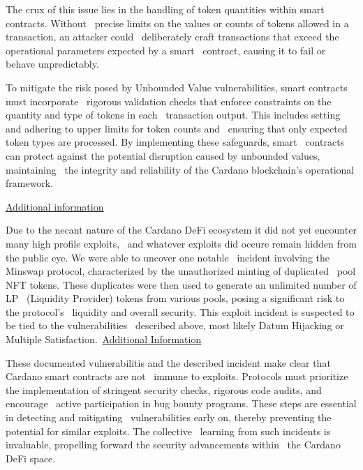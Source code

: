 \documentclass{scrreport}
\begin{document}
\begin{enumerate}
    The crux of this issue lies in the handling of token quantities within smart contracts. Without \
    precise limits on the values or counts of tokens allowed in a transaction, an attacker could \
    deliberately craft transactions that exceed the operational parameters expected by a smart \
    contract, causing it to fail or behave unpredictably.\
    
    To mitigate the risk posed by Unbounded Value vulnerabilities, smart contracts must incorporate \
    rigorous validation checks that enforce constraints on the quantity and type of tokens in each \
    transaction output. This includes setting and adhering to upper limits for token counts and \
    ensuring that only expected token types are processed. By implementing these safeguards, smart \
    contracts can protect against the potential disruption caused by unbounded values, maintaining \
    the integrity and reliability of the Cardano blockchain's operational framework.\
    
    \href{https://github.com/input-output-hk/Certification-working-group/blob/borja/unbounded-value/Vulnerabilities/Vulnerabilities/CTI-2023-ADA-1104.md}{Additional information}

\end{enumerate}

Due to the necant nature of the Cardano DeFi ecosystem it did not yet encounter many high profile exploits, \ 
and whatever exploits did occure remain hidden from the public eye. We were able to uncover one notable \
incident involving the Minswap protocol, characterized by the unauthorized minting of duplicated \
pool NFT tokens. These duplicates were then used to generate an unlimited number of LP \
(Liquidity Provider) tokens from various pools, posing a significant risk to the protocol's \
liquidity and overall security. This exploit incident is suspected to be tied to the vulnerabilities \
described above, most likely Datum Hijacking or Multiple Satisfaction.\ \href{https://minswap-labs.medium.com/vulnerability-patch-technical-details-and-steps-forward-97f6ee35aa91}{Additional Information}
\newline

These documented vulnerabilitis and the described incident make clear that Cardano smart contracts are not \
immune to exploits. Protocols must prioritize the implementation of stringent security checks, rigorous code audits, and encourage \
active participation in bug bounty programs. These steps are essential in detecting and mitigating \
vulnerabilities early on, thereby preventing the potential for similar exploits. The collective \
learning from such incidents is invaluable, propelling forward the security advancements within \
the Cardano DeFi space.
\end{document}
